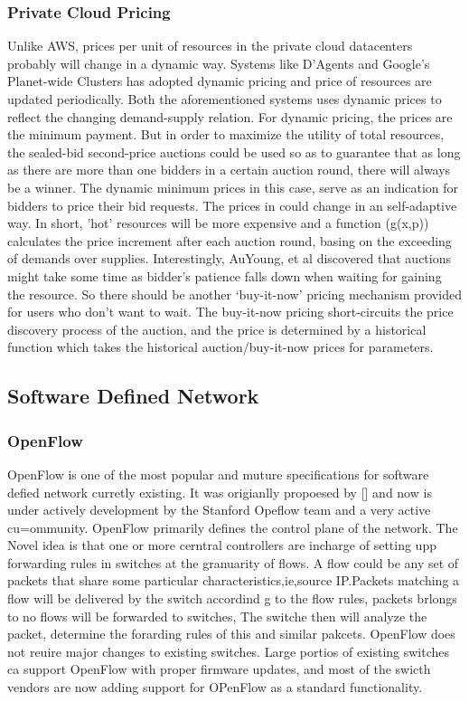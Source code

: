 \documentclass[a4paper,11pt,twocolumn]{article}
\begin{document}
\subsubsection{Private Cloud Pricing}
Unlike AWS, prices per unit of resources in the private cloud datacenters probably will change in a dynamic way.  Systems like D'Agents\cite{dartmouth} and Google's Planet-wide 
Clusters\cite{google} has adopted dynamic pricing and price of resources are updated periodically. Both the aforementioned systems uses dynamic prices to 
reflect the changing demand-supply relation. For dynamic pricing, the prices are the minimum payment. But in order to maximize the utility of total resources,
the sealed-bid second-price auctions \cite{second price} could be used so as to guarantee that as long as there are more than one bidders in a certain auction round, 
there will always be a winner. The dynamic minimum prices in this case, serve as an indication for bidders to price their bid requests. The prices in \cite{google} could 
change in an self-adaptive way. In short, 'hot' resources will be more expensive and a function (g(x,p)) calculates the price increment after each auction round, basing on the 
exceeding of demands over supplies. Interestingly, AuYoung, et al \cite{ucsd} discovered that auctions might take some time as bidder's patience falls down
when waiting for gaining the resource. So there should be another `buy-it-now' pricing mechanism provided for users who don't want to wait. The buy-it-now
pricing short-circuits the price discovery process of the auction, and the price is determined by a historical function which takes the historical auction/buy-it-now
prices for parameters.


\subsection{Software Defined Network}
\subsubsection{OpenFlow}
OpenFlow is one of the most popular and muture specifications for software defied network curretly existing. It was origianlly propoesed by [] and now is under actively development by the Stanford Opeflow team and a very active cu=ommunity.
OpenFlow primarily defines the control plane of the network. The Novel idea is that one or more cerntral controllers are incharge of setting upp forwarding rules in switches at the granuarity of flows. A flow could be any set of packets that share some particular characteristics,ie,source IP.Packets matching a  flow will be delivered by the switch accordind g to the flow rules, packets brlongs to no flows will be forwarded to switches, The switche then will analyze the packet, determine the forarding rules of this and similar pakcets.
OpenFlow does not reuire major changes to existing switches. Large portios of existing switches ca support OpenFlow with proper firmware updates, and most of the swicth vendors are now adding support for OPenFlow as a standard functionality.
\end{document}
